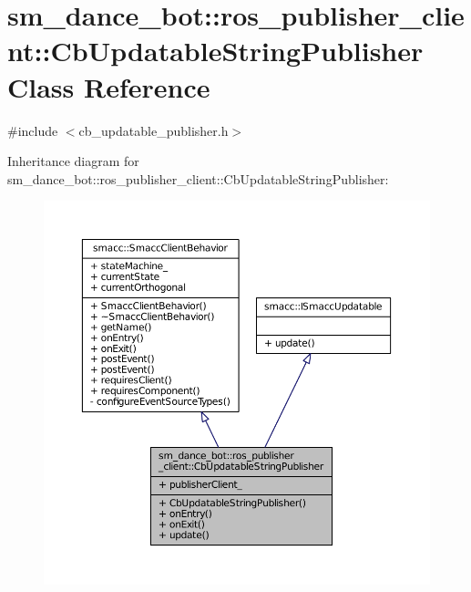 \hypertarget{classsm__dance__bot_1_1ros__publisher__client_1_1CbUpdatableStringPublisher}{}\section{sm\+\_\+dance\+\_\+bot\+:\+:ros\+\_\+publisher\+\_\+client\+:\+:Cb\+Updatable\+String\+Publisher Class Reference}
\label{classsm__dance__bot_1_1ros__publisher__client_1_1CbUpdatableStringPublisher}


{\ttfamily \#include $<$cb\+\_\+updatable\+\_\+publisher.\+h$>$}



Inheritance diagram for sm\+\_\+dance\+\_\+bot\+:\+:ros\+\_\+publisher\+\_\+client\+:\+:Cb\+Updatable\+String\+Publisher\+:
\nopagebreak
\begin{figure}[H]
\begin{center}
\leavevmode
\includegraphics[width=350pt]{classsm__dance__bot_1_1ros__publisher__client_1_1CbUpdatableStringPublisher__inherit__graph}
\end{center}
\end{figure}


